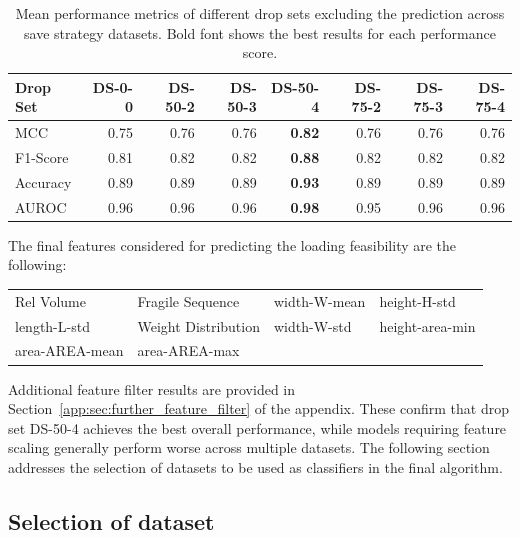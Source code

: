 \begin{table}[ht]
	\centering
	\small
	\begin{tabular}{lrrrrrrr}
		\toprule
		Drop Set & DS-0-0 & DS-50-2 & DS-50-3 & DS-50-4       & DS-75-2 & DS-75-3 & DS-75-4 \\
		\midrule
		MCC      & 0.75   & 0.76    & 0.76    & \textbf{0.82} & 0.76    & 0.76    & 0.76    \\
		F1-Score & 0.81   & 0.82    & 0.82    & \textbf{0.88} & 0.82    & 0.82    & 0.82    \\
		Accuracy & 0.89   & 0.89    & 0.89    & \textbf{0.93} & 0.89    & 0.89    & 0.89    \\
		AUROC    & 0.96   & 0.96    & 0.96    & \textbf{0.98} & 0.95    & 0.96    & 0.96    \\
		\bottomrule
	\end{tabular}
	\caption[Mean performance metrics of different drop sets.]
	{Mean performance metrics of different drop sets excluding the prediction across save strategy datasets.
		Bold font shows the best results for each performance score.}
	\label{tab:featurePerformance_Alldata}
\end{table}

The final features considered for predicting the loading feasibility are the following:
\begin{table}[!ht]
	\centering
	\def\arraystretch{1.5}
	\begin{tabular}{l l l l }
		\sbt Rel Volume      & \sbt Fragile Sequence    & \sbt width-W-mean & \sbt height-H-std    \\
		\sbt  length-L-std   & \sbt Weight Distribution & \sbt width-W-std  & \sbt height-area-min \\
		\sbt  area-AREA-mean & \sbt area-AREA-max       &                   &                      \\
	\end{tabular}
\end{table}

Additional feature filter results are provided in Section~\ref{app:sec:further_feature_filter} of the appendix.
These confirm that drop set DS-50-4 achieves the best overall performance, while models requiring feature scaling generally perform worse
across multiple datasets. The following section addresses the selection of datasets to be used as classifiers in the final algorithm.

\subsection{Selection of dataset}
\label{sec:dataset_selection}

